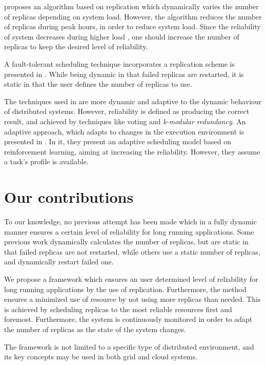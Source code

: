 \documentclass{cslthse-msc}
\begin{document}
\cite{adaptiveCheckPointAndRep} proposes an algorithm based on replication which dynamically varies the number of replicas depending on system load. However, the algorithm reduces the number of replicas during peak hours, in order to reduce system load. Since the reliability of system decreases during higher load \cite{studyOfFailures} \cite{studyOfFailures} \cite{implicationsOfFailures}, one should increase the number of replicas to keep the desired level of reliability.

A fault-tolerant scheduling technique incorporates a replication scheme is presented in \cite{faultTolerantSchedPolicy}. While being dynamic in that failed replicas are restarted, it is static in that the user defines the number of replicas to use.

The techniques used in \cite{selfAdaptRel} \cite{dynAdaptRepl} \cite{relModelWebServices} are more dynamic and adaptive to the dynamic behaviour of distributed systems. However, reliability is defined as producing the correct result, and achieved by techniques like voting and \emph{k-modular redundancy}.
An adaptive approach, which adapts to changes in the execution environment is presented in \cite{imprRelAdaptRL}. In it, they present an adaptive scheduling model based on reinforcement learning, aiming at increasing the reliability. However, they assume a task's profile is available.


\section{Our contributions}
To our knowledge, no previous attempt has been made which in a fully dynamic manner ensures a certain level of reliability for long running applications. Some previous work dynamically calculates the number of replicas, but are static in that failed replicas are not restarted, while others use a static number of replicas, and dynamically restart failed one.

We propose a framework which ensures an user determined level of reliability for long running applications by the use of replication. Furthermore, the method ensures a minimized use of resource by not using more replicas than needed. This is achieved by scheduling replicas to the most reliable resources first and foremost. Furthermore, the system is continuously monitored in order to adapt the number of replicas as the state of the system changes.

The framework is not limited to a specific type of distributed environment, and its key concepts may be used in both grid and cloud systems.
\end{document}
